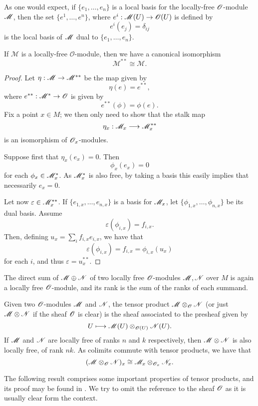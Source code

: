 As one would expect, if $\{e_1,\dots ,e_n\}$ is a local basis for the locally-free $\mathscr{O}$-module $\mathscr{M}$, then the set $\{e^1,\dots ,e^n\}$, where $e^i:\mathscr{M}(U)\to \mathscr{O}(U)$ is defined by
$$e^i(e_j)=\delta_{ij}$$
is the local basis of $\mathscr{M}$ dual to $\{e_1,\dots ,e_n\}$.

\begin{lemma}
If $\mathscr{M}$ is a locally-free $\mathscr{O}$-module, then we have a canonical isomorphism
$$\mathscr{M}^{**}\cong \mathscr{M}.$$
\end{lemma}
\begin{proof}
Let $\eta:\mathscr{M}\rightarrow \mathscr{M}^{**}$ be the map given by
$$\eta (e)=e^{**},$$
where $e^{**}:\mathscr{M}^*\rightarrow \mathscr{O}$ is given by
$$e^{**}(\phi )=\phi (e).$$
Fix a point $x\in M$; we then only need to show that the stalk map
$$\eta_x:\mathscr{M}_x\longrightarrow \mathscr{M}_x^{**}$$
is an isomorphism of $\mathscr{O}_x$-modules.

Suppose first that $\eta_x(e_x)=0$. Then
$$\phi_x(e_x)=0$$
for each $\phi_x\in \mathscr{M}_x^*$. As $\mathscr{M}^*_x$ is also free, by taking a basis this easily implies that necessarily $e_x=0$.

Let now $\varepsilon \in \mathscr{M}^{**}_x$. If $\{e_{1,x},\dots ,e_{n,x}\}$ is a basis for $\mathscr{M}_x$, let $\{\phi_{1,x},\dots ,\phi_{n,x}\}$ be its dual basis. Assume
$$\varepsilon (\phi_{i,x})=f_{i,x}.$$
Then, defining $u_x=\sum_if_{i,x}e_{i,x}$, we have that
$$\varepsilon (\phi_{i,x})=f_{i,x}=\phi_{i,x}(u_x)$$
for each $i$, and thus $\varepsilon =u_x^{**}$.
\end{proof}

The direct sum of $\mathscr{M}\oplus \mathscr{N}$ of two locally free $\mathscr{O}$-modules $\mathscr{M},\mathscr{N}$ over $M$ is again a locally free $\mathscr{O}$-module, and its rank is the sum of the ranks of each summand. 

Given two $\mathscr{O}$-modules $\mathscr{M}$ and $\mathscr{N}$, the tensor product $\mathscr{M}\otimes_{\mathscr{O}}\mathscr{N}$ (or just $\mathscr{M}\otimes \mathscr{N}$ if the sheaf $\mathscr{O}$ is clear) is the sheaf associated to the presheaf given by
$$U\longmapsto \mathscr{M}(U)\otimes_{\mathscr{O}(U)}\mathscr{N}(U).$$
If $\mathscr{M}$ and $\mathscr{N}$ are locally free of ranks $n$ and $k$ respectively, then $\mathscr{M}\otimes \mathscr{N}$ is also locally free, of rank $nk$.
As colimits commute with tensor products, we have that
$$(\mathscr{M}\otimes_{\mathscr{O}} \mathscr{N})_x\cong \mathscr{M}_x\otimes_{\mathscr{O}_x}\mathscr{N}_x.$$

The following result comprises some important properties of tensor products, and its proof may be found in \cite{kn:gortz_wed}. We try to omit the reference to the sheaf $\mathscr{O}$ as it is usually clear form the context.

